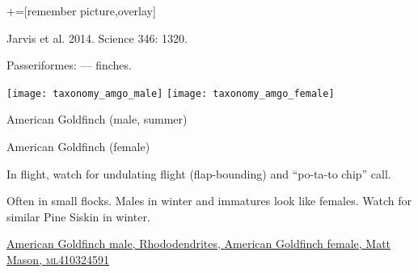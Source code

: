 \documentclass[t]{beamer}
\newcommand{\backoneline}{\vspace{-\baselineskip}}
\begin{document}
{
	{	+=[remember picture,overlay]
		\begin{frame}[b, plain]
			
			\tiny\hfill Jarvis et al. 2014. Science 346: 1320.
		\end{frame}
}}



\begin{frame}{Passeriformes:  — finches.}

		\texttt{[image: taxonomy\_amgo\_male]}\hfill
		\texttt{[image: taxonomy\_amgo\_female]}
	
		\backoneline
		
		\begin{multicols}{2}
			American Goldfinch (male, summer)
			
			\columnbreak
			
			American Goldfinch (female)
			
		\end{multicols}	

			In flight, watch for undulating flight (flap-bounding) and “po-ta-to chip” call. 
			
			\medskip
			
			Often in small flocks. Males in winter and immatures look like females. Watch for similar Pine Siskin in winter.
	
	\vfilll
	
	\tiny
	
	\href{https://commons.wikimedia.org/wiki/File:American_goldfinch_in_PP_(72124).jpg}{American Goldfinch male, Rhododendrites, } \hfill 
	\href{https://macaulaylibrary.org/asset/410324591}{American Goldfinch female, Matt Mason, \textsc{ml}410324591}

\end{frame}
\end{document}

